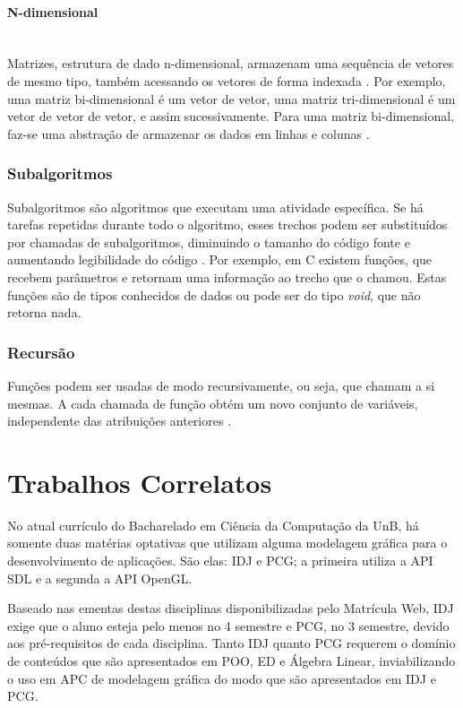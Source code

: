 \paragraph{N-dimensional} \mbox{}\\
Matrizes, estrutura de dado n-dimensional, armazenam uma sequência de vetores de mesmo tipo, também acessando os vetores de forma indexada \cite{algoritmos}. Por exemplo, uma matriz bi-dimensional é um vetor de vetor, uma matriz tri-dimensional é um vetor de vetor de vetor, e assim sucessivamente. Para uma matriz bi-dimensional, faz-se uma abstração de armazenar os dados em linhas e colunas \cite{cprogramming}. 

\subsubsection{Subalgoritmos}
Subalgoritmos são algoritmos que executam uma atividade específica. Se há tarefas repetidas durante todo o algoritmo, esses trechos podem ser substituídos por chamadas de subalgoritmos, diminuindo o tamanho do código fonte e aumentando legibilidade do código \cite{subalgoritmo}. Por exemplo, em C existem funções, que recebem parâmetros e retornam uma informação ao trecho que o chamou. Estas funções são de tipos conhecidos de dados ou pode ser do tipo \emph{void}, que não retorna nada.

\subsubsection{Recursão}
Funções podem ser usadas de modo recursivamente, ou seja, que chamam a si mesmas. A cada chamada de função obtém um novo conjunto de variáveis, independente das atribuições anteriores \cite{cprogramming}.


\section{Trabalhos Correlatos}

 No  atual  currículo  do  Bacharelado  em  Ciência  da  Computação  da
 \acrshort{UnB}, há somente duas matérias optativas que utilizam
 alguma modelagem  gráfica para  o desenvolvimento de  aplicações.  São
 elas:  \acrfull{IDJ}  e  \acrfull{PCG};  a primeira utiliza a \acrshort{API} SDL  e a segunda a
 \acrshort{API} OpenGL.
 
 Baseado nas ementas destas disciplinas disponibilizadas pelo Matrícula
 Web, \acrshort{IDJ} exige que o aluno esteja pelo menos no 4\oo{} semestre e \acrshort{PCG},
 no  3\oo{} semestre,  devido  aos pré-requisitos  de cada  disciplina.
 Tanto  \acrshort{IDJ}  quanto  \acrshort{PCG}  requerem  o  domínio  de  conteúdos  que  são
 apresentados em  \acrfull{POO}, \acrfull{ED} e  Álgebra  Linear,  inviabilizando  o uso  em \acrshort{APC}  de
 modelagem gráfica do modo que são apresentados em \acrshort{IDJ} e \acrshort{PCG}.


